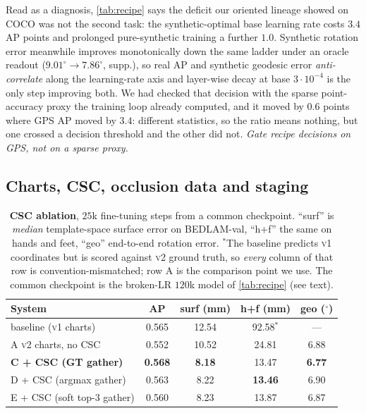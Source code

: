Read as a diagnosis, \cref{tab:recipe} says the deficit our oriented lineage showed on COCO was not
the second task: the synthetic-optimal base learning rate costs $3.4$ AP points and prolonged
pure-synthetic training a further $1.0$. Synthetic rotation error meanwhile improves monotonically
down the same ladder under an oracle readout ($9.01^\circ\!\rightarrow\!7.86^\circ$, supp.), so
real AP and synthetic geodesic error \emph{anti-correlate} along the learning-rate axis and
layer-wise decay at base $3\!\cdot\!10^{-4}$ is the only step improving both. We had checked that
decision with the sparse point-accuracy proxy the training loop already computed, and it moved by
$0.6$ points where GPS AP moved by $3.4$: different statistics, so the ratio means nothing, but one
crossed a decision threshold and the other did not. \emph{Gate recipe decisions on GPS, not on a
sparse proxy.}

\subsection{Charts, CSC, occlusion data and staging}
\label{sec:exp_csc}

\begin{table}[!tb]
\centering\scriptsize\renewcommand{\arraystretch}{0.94}
\setlength{\tabcolsep}{4pt}
\begin{tabular}{lcccc}
\toprule
System & AP & surf (mm) & h+f (mm) & geo ($^\circ$) \\
\midrule
baseline (\textsc{v1} charts)      & 0.565 & 12.54 & 92.58$^{*}$ & ---\\
A\; \textsc{v2} charts, no CSC     & 0.552 & 10.52 & 24.81 & 6.88\\
\textbf{C\; + CSC (GT gather)}     & \textbf{0.568} & \textbf{8.18} & 13.47 & \textbf{6.77}\\
D\; + CSC (argmax gather)          & 0.563 & 8.22  & \textbf{13.46} & 6.90\\
E\; + CSC (soft top-3 gather)      & 0.560 & 8.23  & 13.87 & 6.87\\
\bottomrule
\end{tabular}
\caption{\textbf{CSC ablation}, $25$k fine-tuning steps from a common checkpoint. ``surf'' is
\emph{median} template-space surface error on BEDLAM-val, ``h+f'' the same on hands and feet,
``geo'' end-to-end rotation error. $^{*}$The baseline predicts \textsc{v1} coordinates but is
scored against \textsc{v2} ground truth, so \emph{every} column of that row is
convention-mismatched; row A is the comparison point we use. The common checkpoint is the
broken-LR $120$k model of \cref{tab:recipe} (see text).}
\label{tab:csc}
\end{table}

